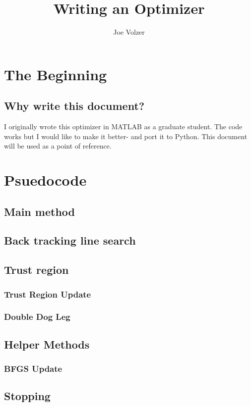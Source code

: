 \documentclass[a4paper,twoside,10pt]{report}
\begin{document}
\pagestyle{empty} %


\title{Writing an Optimizer}
\author{Joe Volzer}
\maketitle

\pagestyle{plain} %


\chapter{The Beginning}\label{hints}

\section{Why write this document?}\label{beginning}
I originally wrote this optimizer in MATLAB as a graduate student. The code works but I would like to make it better- and port it to Python. This document will be used as a point of reference. 

\chapter{Psuedocode}
\section{Main method}



\section{Back tracking line search}




\section{Trust region}


\subsection{Trust Region Update}


\subsection{Double Dog Leg}


\section{Helper Methods}
\subsection{BFGS Update}


\section{Stopping}

\end{document}
